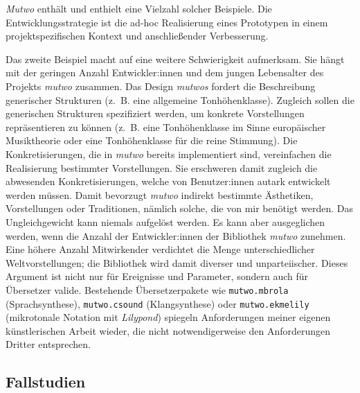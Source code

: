 \documentclass[12pt,a4paper,ngerman]{article}
\begin{document}
\smallskip

\emph{Mutwo} enthält und enthielt eine Vielzahl solcher Beispiele.
Die Entwicklungsstrategie ist die ad-hoc Realisierung eines Prototypen in einem projektspezifischen Kontext und anschließender Verbesserung.

\bigskip

Das zweite Beispiel macht auf eine weitere Schwierigkeit aufmerksam.
Sie hängt mit der geringen Anzahl Entwickler:innen und dem jungen Lebensalter des Projekts \emph{mutwo} zusammen.
Das Design \emph{mutwos} fordert die Beschreibung generischer Strukturen (z.~B. eine allgemeine Tonhöhenklasse).
Zugleich sollen die generischen Strukturen spezifiziert werden, um konkrete Vorstellungen repräsentieren zu können (z.~B. eine Tonhöhenklasse im Sinne europäischer Musiktheorie oder eine Tonhöhenklasse für die reine Stimmung).
Die Konkretisierungen, die in \emph{mutwo} bereits implementiert sind, vereinfachen die Realisierung bestimmter Vorstellungen.
Sie erschweren damit zugleich die abwesenden Konkretisierungen, welche von Benutzer:innen autark entwickelt werden müssen.
Damit bevorzugt \emph{mutwo} indirekt bestimmte Ästhetiken, Vorstellungen oder Traditionen, nämlich solche, die von mir benötigt werden.
Das Ungleichgewicht kann niemals aufgelöst werden.
Es kann aber ausgeglichen werden, wenn die Anzahl der Entwickler:innen der Bibliothek \emph{mutwo} zunehmen.
Eine höhere Anzahl Mitwirkender verdichtet die Menge unterschiedlicher Weltvorstellungen; die Bibliothek wird damit diverser und unparteiischer.
Dieses Argument ist nicht nur für Ereignisse und Parameter, sondern auch für Übersetzer valide.
Bestehende Übersetzerpakete wie \texttt{mutwo.mbrola} (Sprachsynthese), \texttt{mutwo.csound} (Klangsynthese) oder \texttt{mutwo.ekmelily} (mikrotonale Notation mit \emph{Lilypond}) spiegeln Anforderungen meiner eigenen künstlerischen Arbeit wieder, die nicht notwendigerweise den Anforderungen Dritter entsprechen.


%



\subsection{Fallstudien}
\end{document}
